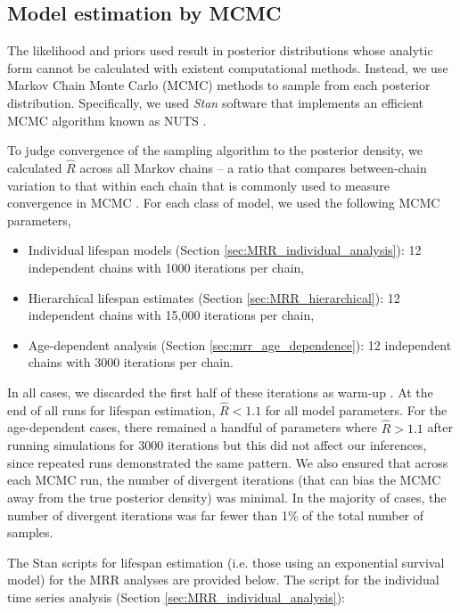 \documentclass[12pt]{article}
\begin{document}
\subsection{Model estimation by MCMC}\label{sec:mrr_MCMC}
The likelihood and priors used result in posterior distributions whose analytic form cannot be calculated with existent computational methods. Instead, we use Markov Chain Monte Carlo (MCMC) methods to sample from each posterior distribution. Specifically, we used \textit{Stan} software \citep{carpenter2016stan} that implements an efficient MCMC algorithm known as NUTS \citep{hoffman2014no}.

To judge convergence of the sampling algorithm to the posterior density, we calculated $\hat{R}$ across all Markov chains -- a ratio that compares between-chain variation to that within each chain that is commonly used to measure convergence in MCMC \citep{gelman1992inference}. For each class of model, we used the following MCMC parameters,
%
\begin{itemize}
	\item Individual lifespan models (Section \ref{sec:MRR_individual_analysis}): 12 independent chains with 1000 iterations per chain,
	\item Hierarchical lifespan estimates (Section \ref{sec:MRR_hierarchical}): 12 independent chains with 15,000 iterations per chain,
	\item Age-dependent analysis (Section \ref{sec:mrr_age_dependence}): 12 independent chains with 3000 iterations per chain.
\end{itemize}

In all cases, we discarded the first half of these iterations as warm-up \citep{gelman2014bayesian}. At the end of all runs for lifespan estimation, $\hat{R}<1.1$ for all model parameters. For the age-dependent cases, there remained a handful of parameters where $\hat{R}>1.1$ after running simulations for 3000 iterations but this did not affect our inferences, since repeated runs demonstrated the same pattern. We also ensured that across each MCMC run, the number of divergent iterations (that can bias the MCMC away from the true posterior density) was minimal. In the majority of cases, the number of divergent iterations was far fewer than 1\% of the total number of samples.

The Stan scripts for lifespan estimation (i.e. those using an exponential survival model) for the MRR analyses are provided below. The script for the individual time series analysis (Section \ref{sec:MRR_individual_analysis}):
\end{document}
